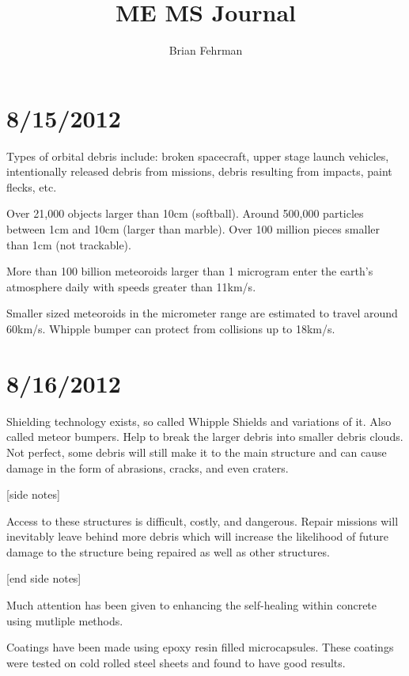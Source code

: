 \documentclass[11pt]{article} %
\title{ME MS Journal}
\author{Brian Fehrman}
\begin{document}
\maketitle

\section{8/15/2012}
Types of orbital debris include: broken spacecraft, upper stage launch vehicles, intentionally released debris from missions, debris resulting from impacts, paint flecks, etc.

Over 21,000 objects larger than 10cm (softball). Around 500,000 particles between 1cm and 10cm (larger than marble). Over 100 million pieces smaller than 1cm (not trackable). 

\cite{NASAOD2012}

More than 100 billion meteoroids larger than 1 microgram enter the earth's atmosphere daily with speeds greater than 11km/s.

Smaller sized meteoroids in the micrometer range are estimated to travel around 60km/s. Whipple bumper can protect from collisions up to 18km/s.

\cite{Close2010}

\section{8/16/2012}
Shielding technology exists, so called Whipple Shields and variations of it. Also called meteor bumpers. Help to break the larger debris into smaller debris clouds. Not perfect, some debris will still make it to the main structure and can cause damage in the form of abrasions, cracks, and even craters. 

[side notes]

Access to these structures is difficult, costly, and dangerous. Repair missions will inevitably leave behind more debris which will increase the likelihood of future damage to the structure being repaired as well as other structures.

[end side notes]

\cite{NASAHVIT2012}

Much attention has been given to enhancing the self-healing within concrete using mutliple methods.

\cite{Wu2012}

Coatings have been made using epoxy resin filled microcapsules. These coatings were tested on cold rolled steel sheets and found to have good results.
\end{document}
